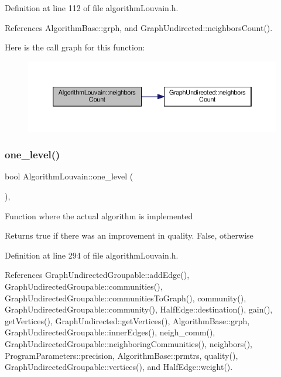 Definition at line 112 of file algorithm\+Louvain.\+h.



References Algorithm\+Base\+::grph, and Graph\+Undirected\+::neighbors\+Count().

Here is the call graph for this function\+:
\nopagebreak
\begin{figure}[H]
\begin{center}
\leavevmode
\includegraphics[width=350pt]{classAlgorithmLouvain_a2fb0859e6b2dfdd4285cc865a2b2531f_cgraph}
\end{center}
\end{figure}
\mbox{\label{classAlgorithmLouvain_a5370c76e777b7cbfddd1dccd865d9356}} 
\subsubsection{\texorpdfstring{one\+\_\+level()}{one\_level()}}
{\footnotesize\ttfamily bool Algorithm\+Louvain\+::one\+\_\+level (\begin{DoxyParamCaption}{ }\end{DoxyParamCaption})\hspace{0.3cm}{\ttfamily [inline]}, {\ttfamily [private]}}

Function where the actual algorithm is implemented

\begin{DoxyReturn}{Returns}
true if there was an improvement in quality. False, otherwise 
\end{DoxyReturn}


Definition at line 294 of file algorithm\+Louvain.\+h.



References Graph\+Undirected\+Groupable\+::add\+Edge(), Graph\+Undirected\+Groupable\+::communities(), Graph\+Undirected\+Groupable\+::communities\+To\+Graph(), community(), Graph\+Undirected\+Groupable\+::community(), Half\+Edge\+::destination(), gain(), get\+Vertices(), Graph\+Undirected\+::get\+Vertices(), Algorithm\+Base\+::grph, Graph\+Undirected\+Groupable\+::inner\+Edges(), neigh\+\_\+comm(), Graph\+Undirected\+Groupable\+::neighboring\+Communities(), neighbors(), Program\+Parameters\+::precision, Algorithm\+Base\+::prmtrs, quality(), Graph\+Undirected\+Groupable\+::vertices(), and Half\+Edge\+::weight().



